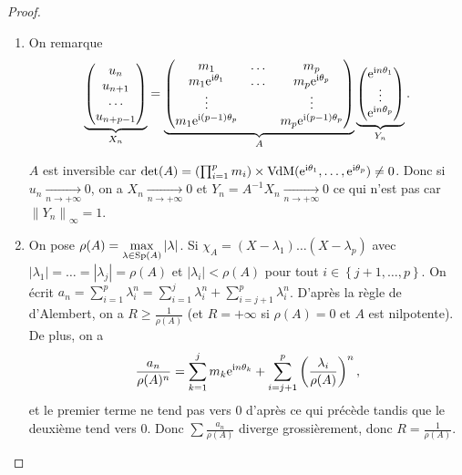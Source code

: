 \documentclass[12pt]{article}
\begin{document}
\begin{proof}
    \phantom{}
    \begin{enumerate}
        \item On remarque
        \begin{equation}
            \underbrace{\begin{pmatrix}
                u_n\\
                u_{n+1}\\
                \dots\\
                u_{n+p-1}
            \end{pmatrix}}_{X_n}
            =
            \underbrace{
                \begin{pmatrix}
                    m_1 & \dots & m_p\\
                    m_{1}\mathrm{e}^{\mathrm{i}\theta_{1}} & \dots & m_p\mathrm{e}^{\mathrm{i}\theta_{p}}\\
                    \vdots & & \vdots\\
                    m_1\mathrm{e}^{\mathrm{i}(p-1)\theta_p} & & m_p\mathrm{e}^{\mathrm{i}(p-1)\theta_p}
                \end{pmatrix}
            }_{A}
            \underbrace{
                \begin{pmatrix}
                    \mathrm{e}^{\mathrm{i} n\theta_1}\\
                    \vdots\\
                    \mathrm{e}^{\mathrm{i} n\theta_p}
                \end{pmatrix}
            }_{Y_n}.
        \end{equation}

        $A$ est inversible car $\det(A)=\left(\prod_{i=1}^{p}m_{i}\right)\times\text{VdM}(\mathrm{e}^{\mathrm{i}\theta_1},\dots,\mathrm{e}^{\mathrm{i}\theta_p})\neq0$. Donc si $u_n\xrightarrow[n\to+\infty]{}0$, on a $X_n\xrightarrow[n\to+\infty]{}0$ et $Y_n=A^{-1}X_{n}\xrightarrow[n\to+\infty]{}0$ ce qui n'est pas car $\left\lVert Y_n\right\rVert_{\infty}=1$.

        \item On pose $\rho(A)=\max\limits_{\lambda\in\operatorname{Sp}(A)}\left\lvert\lambda\right\rvert$. Si $\chi_{A}=(X-\lambda_{1})\dots(X-\lambda_{p})$ avec $\left\lvert \lambda_{1}\right\rvert=\dots=\left\lvert\lambda_{j}\right\rvert=\rho(A)$ et $\left\lvert\lambda_{i}\right\rvert<\rho(A)$ pour tout $i\in\left\lbrace j+1,\dots,p\right\rbrace$. On écrit $a_n=\sum_{i=1}^{p}\lambda_{i}^{n}=\sum_{i=1}^{j}\lambda_{i}^{n}+\sum_{i=j+1}^{p}\lambda_{i}^{n}$. D'après la règle de d'Alembert, on a $R\geqslant\frac{1}{\rho(A)}$ (et $R=+\infty$ si $\rho(A)=0$ et $A$ est nilpotente). De plus, on a 
        \begin{equation}
            \frac{a_n}{\rho(A)^{n}}=\sum_{k=1}^{j}m_{k}\mathrm{e}^{\mathrm{i} n\theta_k}+\sum_{i=j+1}^{p}\left(\frac{\lambda_{i}}{\rho(A)}\right)^{n},
        \end{equation}
        et le premier terme ne tend pas vers 0 d'après ce qui précède tandis que le deuxième tend vers 0. Donc $\sum \frac{a_{n}}{\rho(A)}$ diverge grossièrement, donc $R=\frac{1}{\rho(A)}$.


\end{enumerate}
\end{proof}
\end{document}
